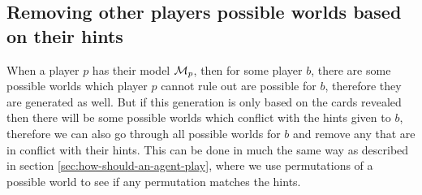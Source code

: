 \subsection{Removing other players possible worlds based on their hints} \label{sec:design:removing-worlds-based-on-hints}
When a player $p$ has their model $\mathcal{M}_p$, then for some player $b$, there are some possible worlds which player $p$ cannot rule out are possible for $b$, therefore they are generated as well. But if this generation is only based on the cards revealed then there will be some possible worlds which conflict with the hints given to $b$, therefore we can also go through all possible worlds for $b$ and remove any that are in conflict with their hints. This can be done in much the same way as described in section \ref{sec:how-should-an-agent-play}, where we use permutations of a possible world to see if any permutation matches the hints.

